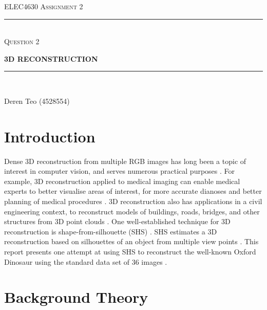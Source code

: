 \begin{titlepage}
  \centering

  \textsc{ELEC4630 Assignment 2}\\
  \vspace{9cm}

  \rule{\linewidth}{0.5pt}\\

  \vspace{1em}
  \LARGE\textsc{Question 2}\\
  \vspace{1em}

  \LARGE\uppercase{\textbf{{3D Reconstruction}}}\\

  \rule{\linewidth}{2pt}\\

  \vfill

  \normalsize{Deren Teo (4528554)}
  \vspace{1cm}

\end{titlepage}

\section{Introduction}

Dense 3D reconstruction from multiple RGB images has long been a topic of interest in computer vision, and serves numerous practical purposes \cite{ulusoy_2016}. For example, 3D reconstruction applied to medical imaging can enable medical experts to better visualise areas of interest, for more accurate dianoses and better planning of medical procedures \cite{icoi_nd}. 3D reconstruction also has applications in a civil engineering context, to reconstruct models of buildings, roads, bridges, and other structures from 3D point clouds \cite{ma_2018}. One well-established technique for 3D reconstruction is shape-from-silhouette (SHS) \cite{cheung_2005}. SHS estimates a 3D reconstruction based on silhouettes of an object from multiple view points \cite{cheung_2005}. This report presents one attempt at using SHS to reconstruct the well-known Oxford Dinosaur using the standard data set of 36 images \cite{schoning_2015}.

\newpage
\section{Background Theory}


